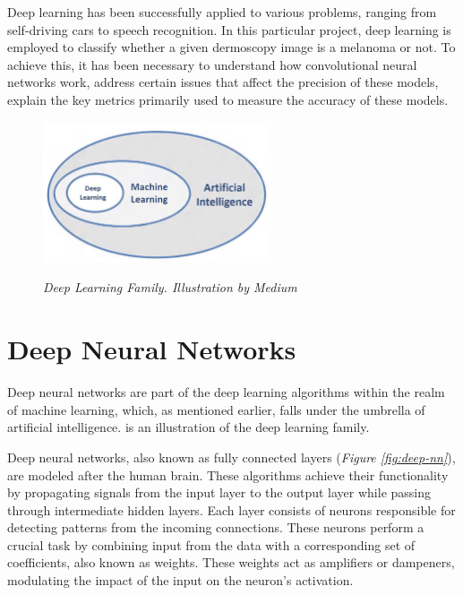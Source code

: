Deep learning has been successfully applied to various problems, ranging from
self-driving cars to speech recognition. In this particular project, deep
learning is employed to classify whether a given dermoscopy image is a melanoma
or not. To achieve this, it has been necessary to understand how convolutional
neural networks work, address certain issues that affect the precision of these
models, explain the key metrics primarily used to measure the accuracy of these
models.

\newpage

\begin{figure}[H]
  \centering
  \includegraphics[width=0.6\textwidth]{imatges/preliminaries/deep-learning-family.jpg}
  \caption[Deep Learning Family]{\textit{Deep Learning Family. Illustration by Medium}}
  {\label{fig:deep-learning-family}}
\end{figure}

\section{Deep Neural Networks}

Deep neural networks are part of the deep learning algorithms within the realm
of machine learning, which, as mentioned earlier, falls under the umbrella of
artificial intelligence. is an
illustration of the deep learning family. \newline


Deep neural networks, also known as fully connected layers (\textit{Figure \ref{fig:deep-nn}}), are modeled after
the human brain. These algorithms achieve their functionality by propagating
signals from the input layer to the output layer while passing through
intermediate hidden layers. Each layer consists of neurons responsible for
detecting patterns from the incoming connections. These neurons perform a
crucial task by combining input from the data with a corresponding set of
coefficients, also known as weights. These weights act as amplifiers or
dampeners, modulating the impact of the input on the neuron's activation.
\newline

